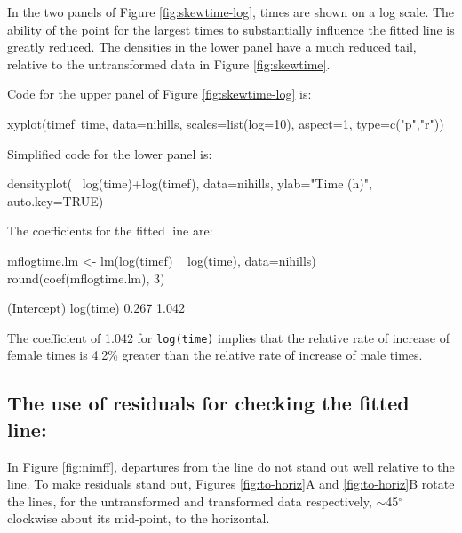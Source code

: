 \documentclass{tufte-book}\usepackage[]{graphicx}\usepackage[]{color}
\newcommand{\txtt}[1]{\texttt{#1}}
\begin{document}
In the two panels of Figure \ref{fig:skewtime-log},
times are shown on a log scale. The ability of the point for the
largest times to substantially influence the fitted line is greatly
reduced.  The densities in the lower panel have a much
reduced tail, relative to the untransformed data in Figure \ref{fig:skewtime}.

Code for the upper panel of Figure \ref{fig:skewtime-log} is:
\begin{Schunk}
\begin{Sinput}
xyplot(timef~time, data=nihills,
       scales=list(log=10),
       aspect=1, type=c("p","r"))
\end{Sinput}
\end{Schunk}
\noindent
Simplified code for the lower panel is:
\begin{Schunk}
\begin{Sinput}
densityplot(~ log(time)+log(timef), data=nihills,
           ylab="Time (h)", auto.key=TRUE)
\end{Sinput}
\end{Schunk}

The coefficients for the fitted line are:
\begin{Schunk}
\begin{Sinput}
mflogtime.lm <- lm(log(timef) ~ log(time),
                   data=nihills)
round(coef(mflogtime.lm), 3)
\end{Sinput}
\begin{Soutput}
(Intercept)   log(time) 
      0.267       1.042 
\end{Soutput}
\end{Schunk}
The coefficient of 1.042 for \txtt{log(time)} implies that the
relative rate of increase of female times is 4.2\% greater than the
relative rate of increase of male times.

\subsection*{The use of residuals for checking the fitted line:}
In Figure \ref{fig:nimff}, departures from the line do not stand out
well relative to the line.  To make residuals stand out, Figures
\ref{fig:to-horiz}A and \ref{fig:to-horiz}B rotate the lines, for the
untransformed and transformed data respectively, $\sim$45$^{\circ}$
clockwise about its mid-point, to the horizontal.
\end{document}
